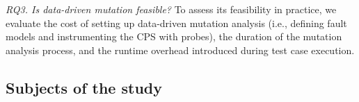 \emph{RQ3.  Is data-driven mutation feasible?}
    To assess its feasibility in practice, we evaluate the cost of setting up data-driven mutation analysis (i.e., defining fault models and instrumenting the CPS with probes), {the duration of the mutation analysis process, and the} runtime overhead introduced during test case execution.  


%
%
%
%


\subsection{Subjects of the study}

%


